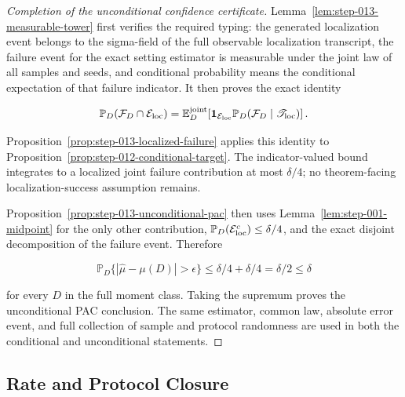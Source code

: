 \begin{proof}[Completion of the unconditional confidence certificate]
Lemma~\ref{lem:step-013-measurable-tower} first verifies the required
typing: the generated localization event belongs to the sigma-field of the
full observable localization transcript, the failure event for the exact
setting estimator is measurable under the joint law of all samples and
seeds, and conditional probability means the conditional expectation of
that failure indicator. It then proves the exact identity

\[
\mathbb P_D(\mathcal F_D\cap\mathcal E_{\rm loc})
=\mathbb E_D^{\rm joint}\!\left[
 \mathbf1_{\mathcal E_{\rm loc}}
 \mathbb P_D(\mathcal F_D\mid\mathscr T_{\rm loc})
\right].
\]

Proposition~\ref{prop:step-013-localized-failure} applies this identity
to Proposition~\ref{prop:step-012-conditional-target}. The
indicator-valued bound integrates to a localized joint failure
contribution at most \(\delta/4\); no theorem-facing localization-success
assumption remains.

Proposition~\ref{prop:step-013-unconditional-pac} then uses Lemma~\ref{lem:step-001-midpoint} for the only other contribution,
\(\mathbb P_D(\mathcal E_{\rm loc}^c)\leq\delta/4\), and the exact disjoint
decomposition of the failure event. Therefore

\[
\mathbb P_D\{|\widehat\mu-\mu(D)|>\epsilon\}
\leq\delta/4+\delta/4=\delta/2\leq\delta
\]

for every \(D\) in the full moment class. Taking the supremum proves the
unconditional PAC conclusion. The same estimator, common law, absolute
error event, and full collection of sample and protocol randomness are used
in both the conditional and unconditional statements.
\end{proof}

\subsection{Rate and Protocol Closure}\label{app:step-014}

